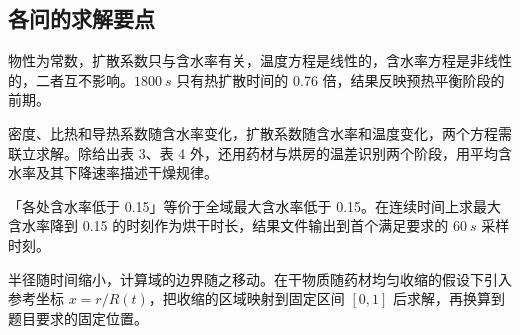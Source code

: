 \subsection{各问的求解要点}

 物性为常数，扩散系数只与含水率有关，温度方程是线性的，含水率方程是非线性的，二者互不影响。$\SI{1800}{s}$ 只有热扩散时间的 0.76 倍，结果反映预热平衡阶段的前期。

 密度、比热和导热系数随含水率变化，扩散系数随含水率和温度变化，两个方程需联立求解。除给出表 3、表 4 外，还用药材与烘房的温差识别两个阶段，用平均含水率及其下降速率描述干燥规律。

 「各处含水率低于 0.15」等价于全域最大含水率低于 0.15。在连续时间上求最大含水率降到 0.15 的时刻作为烘干时长，结果文件输出到首个满足要求的 $\SI{60}{s}$ 采样时刻。

 半径随时间缩小，计算域的边界随之移动。在干物质随药材均匀收缩的假设下引入参考坐标 $x=r/R(t)$，把收缩的区域映射到固定区间 $[0,1]$ 后求解，再换算到题目要求的固定位置。
